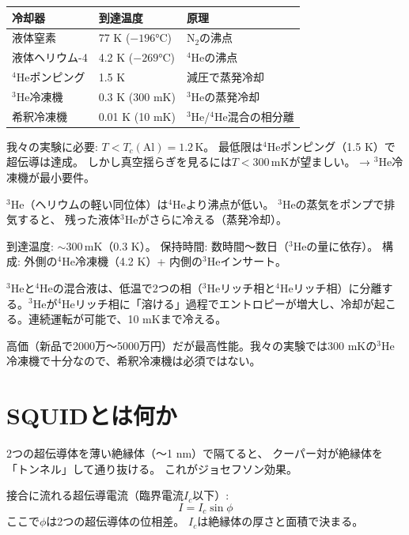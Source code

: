 \documentclass[12pt,a4paper]{article}
\begin{document}
\begin{theorybox}[冷却技術の階層]
\begin{tabular}{lll}
\toprule
冷却器 & 到達温度 & 原理 \\
\midrule
液体窒素 & 77 K ($-196$°C) & N$_2$の沸点 \\
液体ヘリウム-4 & 4.2 K ($-269$°C) & $^4$Heの沸点 \\
$^4$Heポンピング & 1.5 K & 減圧で蒸発冷却 \\
$^3$He冷凍機 & 0.3 K (300 mK) & $^3$Heの蒸発冷却 \\
希釈冷凍機 & 0.01 K (10 mK) & $^3$He/$^4$He混合の相分離 \\
\bottomrule
\end{tabular}

我々の実験に必要: $T < T_c(\mathrm{Al}) = 1.2\,\mathrm{K}$。
最低限は$^4$Heポンピング（1.5 K）で超伝導は達成。
しかし真空揺らぎを見るには$T < 300\,\mathrm{mK}$が望ましい。
→ $^3$He冷凍機が最小要件。
\end{theorybox}

\begin{theorybox}[$^3$He冷凍機の原理]
$^3$He（ヘリウムの軽い同位体）は$^4$Heより沸点が低い。
$^3$Heの蒸気をポンプで排気すると、
残った液体$^3$Heがさらに冷える（蒸発冷却）。

到達温度: $\sim 300\,\mathrm{mK}$（0.3 K）。
保持時間: 数時間〜数日（$^3$Heの量に依存）。
構成: 外側の$^4$He冷凍機（4.2 K）+ 内側の$^3$Heインサート。
\end{theorybox}

\begin{theorybox}[希釈冷凍機の原理（参考）]
$^3$Heと$^4$Heの混合液は、低温で2つの相（$^3$Heリッチ相と$^4$Heリッチ相）に分離する。$^3$Heが$^4$Heリッチ相に「溶ける」過程でエントロピーが増大し、冷却が起こる。連続運転が可能で、10 mKまで冷える。

高価（新品で2000万〜5000万円）だが最高性能。我々の実験では300 mKの$^3$He冷凍機で十分なので、希釈冷凍機は必須ではない。
\end{theorybox}

\section{SQUIDとは何か}

\begin{theorybox}[ジョセフソン接合]
2つの超伝導体を薄い絶縁体（〜1 nm）で隔てると、
クーパー対が絶縁体を「トンネル」して通り抜ける。
これがジョセフソン効果。

接合に流れる超伝導電流（臨界電流$I_c$以下）:
$$I = I_c \sin\phi$$
ここで$\phi$は2つの超伝導体の位相差。
$I_c$は絶縁体の厚さと面積で決まる。
\end{theorybox}
\end{document}
